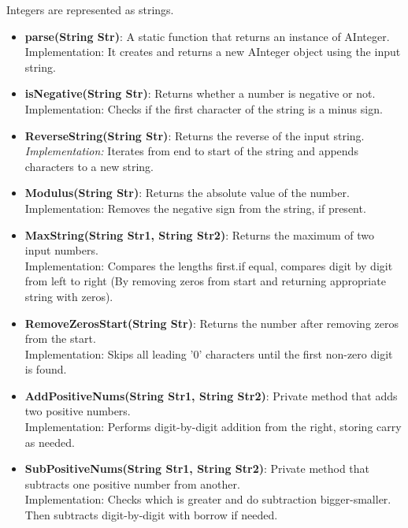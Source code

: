 \documentclass{article}
\begin{document}
Integers are represented as strings.

\begin{itemize}
    \item \textbf{parse(String Str)}: A static function that returns an instance of AInteger. \\
    Implementation: It creates and returns a new AInteger object using the input string.

    \item \textbf{isNegative(String Str)}: Returns whether a number is negative or not. \\
    Implementation: Checks if the first character of the string is a minus sign.

    \item \textbf{ReverseString(String Str)}: Returns the reverse of the input string. \\
    \textit{Implementation:} Iterates from end to start of the string and appends characters to a new string.

    \item \textbf{Modulus(String Str)}: Returns the absolute value of the number. \\
    Implementation: Removes the negative sign from the string, if present.

    \item \textbf{MaxString(String Str1, String Str2)}: Returns the maximum of two input numbers. \\
    Implementation: Compares the lengths first.if equal, compares digit by digit from left to right (By removing zeros from start and returning appropriate string with zeros).

    \item \textbf{RemoveZerosStart(String Str)}: Returns the number after removing zeros from the start. \\
    Implementation: Skips all leading '0' characters until the first non-zero digit is found.

    \item \textbf{AddPositiveNums(String Str1, String Str2)}: Private method that adds two positive numbers. \\
    Implementation: Performs digit-by-digit addition from the right, storing carry as needed.

    \item \textbf{SubPositiveNums(String Str1, String Str2)}: Private method that subtracts one positive number from another. \\
    Implementation: Checks which is greater and do subtraction bigger-smaller. Then subtracts digit-by-digit with borrow if needed.


\end{itemize}
\end{document}
